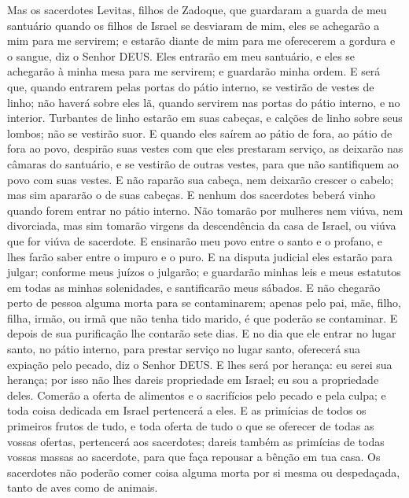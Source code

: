 {  Mas os sacerdotes Levitas, filhos de Zadoque, que guardaram a guarda de meu santuário quando os filhos de Israel se desviaram de mim, eles se achegarão a mim para me servirem; e estarão diante de mim para me oferecerem a gordura e o sangue, diz o Senhor DEUS.
  Eles entrarão em meu santuário, e eles se achegarão à minha mesa para me servirem; e guardarão minha ordem.
  E será que, quando entrarem pelas portas do pátio interno, se vestirão de vestes de linho; não haverá sobre eles lã, quando servirem nas portas do pátio interno, e no interior.
  Turbantes de linho estarão em suas cabeças, e calções de linho sobre seus lombos; não se vestirão
{} suor.
  E quando eles saírem ao pátio de fora, ao pátio de fora ao povo, despirão suas vestes com que eles prestaram serviço, as deixarão nas câmaras do santuário, e se vestirão de outras vestes, para que não santifiquem ao povo com suas vestes.
  E não raparão sua cabeça, nem deixarão crescer o cabelo; mas sim apararão o
{} de suas cabeças.
  E nenhum dos sacerdotes beberá vinho quando forem entrar no pátio interno.
  Não tomarão por mulheres nem viúva, nem divorciada, mas sim tomarão virgens da descendência
 da casa de Israel, ou viúva que for viúva de sacerdote.
  E ensinarão meu povo
{} entre o santo e o profano, e lhes farão saber
{} entre o impuro e o puro.
  E na disputa judicial eles estarão para julgar; conforme meus juízos o julgarão; e guardarão minhas leis e meus estatutos em todas as minhas solenidades, e santificarão meus sábados.
  E não chegarão perto de pessoa alguma morta para se contaminarem; apenas pelo pai, mãe, filho, filha, irmão, ou irmã que não tenha tido marido, é que poderão se contaminar.
  E depois de sua purificação lhe contarão sete dias.
  E no dia que ele entrar no lugar santo, no pátio interno, para prestar serviço no lugar santo, oferecerá sua expiação pelo pecado, diz o Senhor DEUS.
  E
{} lhes será por herança: eu serei sua herança; por isso não lhes dareis propriedade
{} em Israel; eu sou a propriedade deles.
  Comerão a oferta de alimentos e o sacrifícios pelo pecado e pela culpa; e toda coisa dedicada em Israel pertencerá a eles.
  E as primícias de todos os primeiros frutos de tudo, e toda oferta de tudo o que se oferecer de todas as vossas ofertas, pertencerá aos sacerdotes; dareis também as primícias de todas vossas massas ao sacerdote, para que faça repousar a bênção em tua casa.
  Os sacerdotes não poderão comer coisa alguma morta por si mesma ou despedaçada, tanto de aves como de animais.
\par }

